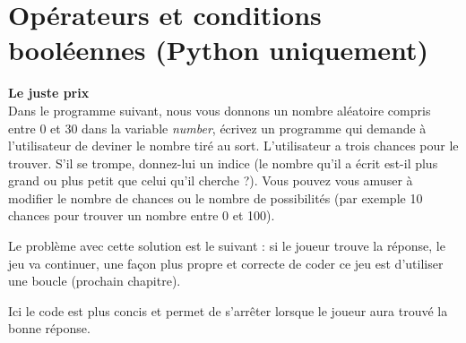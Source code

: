 \section{Opérateurs et conditions booléennes (Python uniquement)}

\begin{Exercice}[20 minutes] \textbf{Le juste prix }\\
  Dans le programme suivant, nous vous donnons un nombre aléatoire compris entre 0 et 30 dans la variable \textit{number}, écrivez un programme qui demande à l'utilisateur de deviner le nombre tiré au sort. L'utilisateur a trois chances pour le trouver. S'il se trompe, donnez-lui un indice (le nombre qu'il a écrit est-il plus grand ou plus petit que celui qu'il cherche ?). Vous pouvez vous amuser à modifier le nombre de chances ou le nombre de possibilités (par exemple 10 chances pour trouver un nombre entre 0 et 100).   \\
  
  
  
  \begin{solution}
   
   
   Le problème avec cette solution est le suivant : si le joueur trouve la réponse, le jeu va continuer, une façon plus propre et correcte de coder ce jeu est d'utiliser une boucle (prochain chapitre). \\
  \end{solution}
  \begin{solution}
   
  \end{solution}
  \begin{solution}
   
  	Ici le code est plus concis et permet de s'arrêter lorsque le joueur aura trouvé la bonne réponse.\\
           
    \end{solution}   
\end{Exercice}

